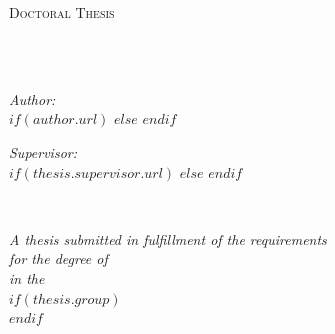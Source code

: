 \frontmatter %

\pagestyle{plain} %


\begin{titlepage}
\begin{center}

\vspace*{.06\textheight}
{\scshape\LARGE \univname\par}\vspace{1.5cm} %
\textsc{\Large Doctoral Thesis}\\[0.5cm] %

\HRule \\[0.4cm] %
{\huge \bfseries \ttitle\par}\vspace{0.4cm} %
\HRule \\[1.5cm] %
 
\begin{minipage}[t]{0.4\textwidth}
\begin{flushleft} \large
\emph{Author:}\\
$if(author.url)$
\href{$author.url$}{\authorname} %
$else$
\authorname
$endif$
\end{flushleft}
\end{minipage}
\begin{minipage}[t]{0.4\textwidth}
\begin{flushright} \large
\emph{Supervisor:} \\
$if(thesis.supervisor.url)$%
\href{$thesis.supervisor.url$}{\supname} %
$else$%
\supname
$endif$
\end{flushright}
\end{minipage}\\[3cm]
 
\vfill

\large \textit{A thesis submitted in fulfillment of the requirements\\ for the degree of \degreename}\\[0.3cm] %
\textit{in the}\\[0.4cm]
$if(thesis.group)$
\groupname\\
$endif$
\deptname\\[2cm] %
 

\end{center}
\end{titlepage}
